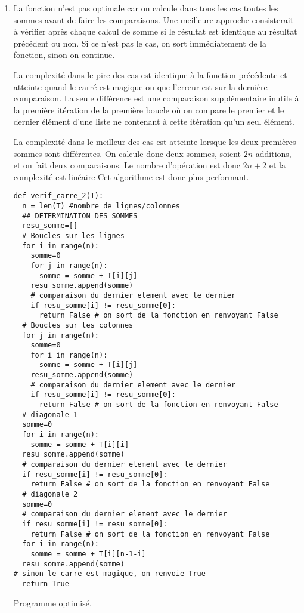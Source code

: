 \begin{enumerate}
\newpage
\item La fonction n'est pas optimale car on calcule dans tous les cas toutes les sommes avant de faire les comparaisons. Une meilleure approche consisterait à vérifier après chaque calcul de somme si le résultat est identique au résultat précédent ou non. Si ce n'est pas le cas, on sort immédiatement de la fonction, sinon on continue.

La complexité dans le pire des cas est identique à la fonction précédente et atteinte quand le carré est magique ou que l'erreur est sur la dernière comparaison. La seule différence est une comparaison supplémentaire inutile à la première itération de la première boucle où on compare le premier et le dernier élément d'une liste ne contenant à cette itération qu'un seul élément.

La complexité dans le meilleur des cas est atteinte lorsque les deux premières sommes sont différentes. On calcule donc deux sommes, soient $2n$ additions, et on fait deux comparaisons. Le nombre d'opération est donc $2n+2$ et la complexité est linéaire Cet algorithme est donc plus performant.

\begin{listing}[htp]
\begin{verbatim}
def verif_carre_2(T):
  n = len(T) #nombre de lignes/colonnes
  ## DETERMINATION DES SOMMES
  resu_somme=[]
  # Boucles sur les lignes
  for i in range(n):
    somme=0
    for j in range(n):
      somme = somme + T[i][j]
    resu_somme.append(somme)
    # comparaison du dernier element avec le dernier
    if resu_somme[i] != resu_somme[0]:
      return False # on sort de la fonction en renvoyant False
  # Boucles sur les colonnes
  for j in range(n):
    somme=0
    for i in range(n):
      somme = somme + T[i][j]
    resu_somme.append(somme)
    # comparaison du dernier element avec le dernier
    if resu_somme[i] != resu_somme[0]:
      return False # on sort de la fonction en renvoyant False
  # diagonale 1
  somme=0
  for i in range(n):
    somme = somme + T[i][i]
  resu_somme.append(somme)
  # comparaison du dernier element avec le dernier
  if resu_somme[i] != resu_somme[0]:
    return False # on sort de la fonction en renvoyant False
  # diagonale 2
  somme=0
  # comparaison du dernier element avec le dernier
  if resu_somme[i] != resu_somme[0]:
    return False # on sort de la fonction en renvoyant False
  for i in range(n):
    somme = somme + T[i][n-1-i]
  resu_somme.append(somme)
# sinon le carre est magique, on renvoie True
  return True
\end{verbatim}
\caption{Programme optimisé.}
\label{prog:factorielle}
\end{listing}

\end{enumerate}

